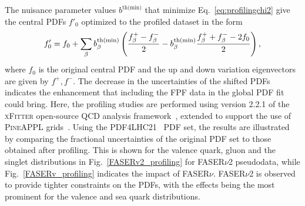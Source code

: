 \documentclass[11pt,a4paper]{article}
\def\frac#1#2{{{#1}\over {#2}}}
\numberwithin{equation}{section}
\numberwithin{figure}{section}
\numberwithin{table}{section}
\begin{document}
{%
The nuisance parameter values $b^{\textrm{th(min)}}$ that minimize Eq.~\eqref{eq:profilingchi2} give the central PDFs $f'_0$ optimized to the profiled dataset in the form
\begin{equation}
f_0' = f_0
      + \sum_\beta b_\beta^{\textrm{th(min)}} 
        \left(  \frac{f_\beta^+   -  f_\beta^- }{2}
              -    b_\beta^{\textrm{th(min)}}
                \frac{f_\beta^+ + f_\beta^- - 2f_0}{2}
        \right),
\end{equation}
where $f_0$ is the original central PDF and the up and down variation eigenvectors are given by $f^+, f^-$. The decrease in the uncertainties of the shifted PDFs indicates the enhancement that including the FPF data in the global PDF fit could bring. Here, the profiling studies are performed using version 2.2.1 of the \textsc{xFitter} open-source QCD analysis framework~\cite{Alekhin:2014irh, Bertone:2017tig, xFitter:2022zjb, xFitter:web}, extended to support the use of \textsc{PineAPPL} grids~\cite{christopher_schwan_2023_7499507, Carrazza:2020gss}.
%
Using the PDF4LHC21~\cite{PDF4LHCWorkingGroup:2022cjn} PDF set, the results are illustrated by comparing the fractional uncertainties of the original PDF set to those obtained after profiling. 
This is shown for the valence quark, gluon and the singlet distributions in Fig.~\ref{FASERv2_profiling} for FASER$\nu$2 pseudodata, while Fig.~\ref{FASERv_profiling} indicates the impact of FASER$\nu$. FASER$\nu$2 is observed to provide tighter constraints on the PDFs, with the effects being the most prominent for the valence and sea quark distributions.

}
\end{document}
